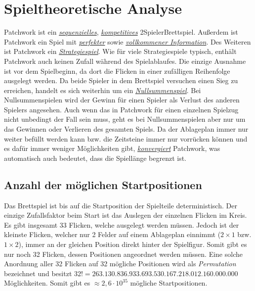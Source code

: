 \section{Spieltheoretische Analyse}
\label{section:spieltheoretische-analyse}

Patchwork ist ein \hyperref[text:game-theory-sequenziell]{\emph{sequenzielles}}, \hyperref[text:game-theory-kompetitiv]{\emph{kompetitives}} 2\textendash{}Spieler\textendash{}Brettspiel. Außerdem ist Patchwork ein Spiel mit \hyperref[text:game-theory-perfekte-information]{\emph{perfekter}} sowie \hyperref[text:game-theory-vollkommene-information]{\emph{vollkommener Information}}. Des Weiteren ist Patchwork ein \hyperref[text:game-theory-strategiespiel]{\emph{Strategiespiel}}. Wie für viele Strategiespiele typisch, enthält Patchwork auch keinen Zufall während des Spielablaufes. Die einzige Ausnahme ist vor dem Spielbeginn, da dort die Flicken in einer zufälligen Reihenfolge ausgelegt werden. Da beide Spieler in dem Brettspiel versuchen einen Sieg zu erreichen, handelt es sich weiterhin um ein \hyperref[text:game-theory-nullsummenspiel]{\emph{Nullsummenspiel}}. Bei Nullsummenspielen wird der Gewinn für einen Spieler als Verlust des anderen Spielers angesehen. Auch wenn das in Patchwork für einen einzelnen Spielzug nicht unbedingt der Fall sein muss, geht es bei Nullsummenspielen aber nur um das Gewinnen oder Verlieren des gesamten Spiels. Da der Ablageplan immer nur weiter befüllt werden kann bzw. die Zeitsteine immer nur vorrücken können und es dafür immer weniger Möglichkeiten gibt, \hyperref[text:game-theory-konvergenz]{\emph{konvergiert}} Patchwork, was automatisch auch bedeutet, dass die Spiellänge begrenzt ist.

\subsection*{Anzahl der möglichen Startpositionen}

Das Brettspiel ist bis auf die Startposition der Spielteile deterministisch. Der einzige Zufallsfaktor beim Start ist das Auslegen der einzelnen Flicken im Kreis. Es gibt insgesamt 33 Flicken, welche ausgelegt werden müssen. Jedoch ist der kleinste Flicken, welcher nur 2 Felder auf einem Ablageplan einnimmt ($2\times1$ bzw. $1\times2$), immer an der gleichen Position direkt hinter der Spielfigur. Somit gibt es nur noch 32 Flicken, dessen Positionen angeordnet werden müssen. Eine solche Anordnung aller 32 Flicken auf 32 mögliche Positionen wird als \emph{Permutation} bezeichnet und besitzt $32! = 263.130.836.933.693.530.167.218.012.160.000.000$ Möglichkeiten. Somit gibt es $\approx 2{,}6 \cdot 10^{35}$ mögliche Startpositionen.

